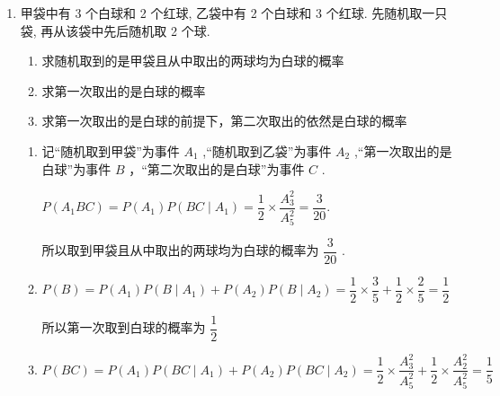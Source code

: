 \begin{enumerate}
\begin{enumerate}
\begin{jieda}
\begin{enumerate}
                \item $P\left( {{B}_{2} \mid  A}\right)  = \dfrac{P\left( {A{B}_{2}}\right) }{P\left( A\right) } = \dfrac{P\left( {A \mid  {B}_{2}}\right) P\left( {B}_{2}\right) }{P\left( A\right) } = \dfrac{{0.6} \times  {0.02}}{1 - {0.976}} = \dfrac{1}{2}$
                
                已知取到的是次品，则它取自第二批产品的概率 $\dfrac{1}{2}$
            \end{enumerate}
        \end{jieda}
        
        \item 甲袋中有 3 个白球和 2 个红球, 乙袋中有 2 个白球和 3 个红球. 先随机取一只袋, 再从该袋中先后随机取 2 个球.
        \begin{enumerate}
            \item 求随机取到的是甲袋且从中取出的两球均为白球的概率
            \item 求第一次取出的是白球的概率
            \item 求第一次取出的是白球的前提下，第二次取出的依然是白球的概率
        \end{enumerate}
        \begin{jieda}
            \begin{enumerate}
                \item 记“随机取到甲袋”为事件 ${A}_{1}$ ,“随机取到乙袋”为事件 ${A}_{2}$ ,“第一次取出的是白球”为事件 $B$ ，“第二次取出的是白球”为事件 $C$ .
                
                $P\left( {{A}_{1}{BC}}\right)  = P\left( {A}_{1}\right) P\left( {{BC} \mid  {A}_{1}}\right)  = \dfrac{1}{2} \times  \dfrac{{{A}}_{3}^{2}}{{{A}}_{5}^{2}} = \dfrac{3}{20}.$
                
                所以取到甲袋且从中取出的两球均为白球的概率为 $\dfrac{3}{20}$ .

                \item $P\left( B\right)  = P\left( {A}_{1}\right) P\left( {B \mid  {A}_{1}}\right)  + P\left( {A}_{2}\right) P\left( {B \mid  {A}_{2}}\right)  = \dfrac{1}{2} \times  \dfrac{3}{5} + \dfrac{1}{2} \times  \dfrac{2}{5} = \dfrac{1}{2}$

                所以第一次取到白球的概率为 $\dfrac{1}{2}$

                \item $P\left( {BC}\right)  = P\left( {A}_{1}\right) P\left( {{BC} \mid  {A}_{1}}\right)  + P\left( {A}_{2}\right) P\left( {{BC} \mid  {A}_{2}}\right)  = \dfrac{1}{2} \times  \dfrac{{A}_{3}^{2}}{{A}_{5}^{2}} + \dfrac{1}{2} \times  \dfrac{{A}_{2}^{2}}{{A}_{5}^{2}} = \dfrac{1}{5}$
                

\end{enumerate}
\end{jieda}
\end{enumerate}
\end{enumerate}
